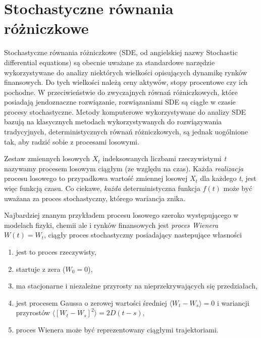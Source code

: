 \documentclass[a4paper,12pt,polish]{sphinxmanual}
\begin{document}
\section{Stochastyczne równania różniczkowe}
\label{ch5/chV013:stochastyczne-rownania-rozniczkowe}\label{ch5/chV013::doc}
Stochastyczne równania różniczkowe (SDE, od angielskiej nazwy Stochastic differential equations)
są obecnie uważane za standardowe narzędzie wykorzystywane do analizy niektórych wielkości opisujących
dynamikę rynków finansowych. Do tych wielkości należą ceny aktywów, stopy procentowe czy ich pochodne.
W przeciwieństwie do zwyczajnych równań różniczkowych, które posiadają jendoznaczne rozwiązanie,
rozwiązaniami SDE są ciągłe w czasie procesy stochastyczne. Metody komputerowe wykorzystywane do analizy
SDE bazują na klasycznych metodach wykorzystywanych do rozwiązywania tradycyjnych, deterministycznych
równań różniczkowych, są jednak uogólnione tak, aby radzić sobie z procesami losowymi.

Zestaw zmiennych losowych $X_t$ indeksowanych liczbami rzeczywistymi \emph{t} nazywamy procesem losowym
ciągłym (ze względu na czas). Każda \emph{realizacja} procesu losowego to przypadkowa wartość zmiennej
losowej $X_t$ dla każdego \emph{t}, jest więc funkcją czasu. Co ciekawe, \emph{każda} deterministyczna
funkcja $f(t)$ może być uważana za proces stochastyczny, którego wariancja znika.

Najbardziej znanym przykładem procesu losowego szeroko występującego w modelach fizyki, chemii ale i
rynków finansowych jest \emph{proces Wienera} $W(t) = W_t$, ciągły proces stochastyczny posiadający
nastepujące własności
\begin{enumerate}
\item {} 
jest to proces rzeczywisty,

\item {} 
startuje z zera ($W_0 = 0$),

\item {} 
ma stacjonarne i niezależne przyrosty na nieprzekrywających się przedziałach,

\item {} 
jest procesem Gaussa o zerowej wartości średniej $\langle W_t - W_s \rangle = 0$
i wariancji przyrostów $\langle [W_t - W_s]^2 \rangle = 2 D (t -s)$,

\item {} 
proces Wienera może być reprezentowany ciągłymi trajektoriami.

\end{enumerate}
\end{document}
